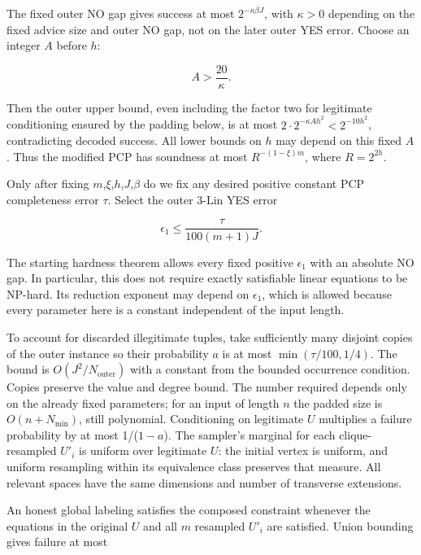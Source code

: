 The fixed outer NO gap gives success at most \(2^{-\kappa \beta J}\), with \(\kappa\)\(>\)0 depending on the fixed advice size and outer NO gap, not on the later outer YES error. Choose an integer \(A\) before \(h\):

\begin{equation}\label{eq:19}
A>\frac{20}{\kappa}.
\end{equation}

Then the outer upper bound, even including the factor two for legitimate
conditioning ensured by the padding below, is at most
$2\cdot2^{-\kappa Ah^2}<2^{-10h^2}$, contradicting decoded success.
All lower bounds on $h$ may depend on this fixed $A$. Thus the modified
PCP has soundness at most $R^{-(1-\xi)m}$, where $R=2^{2h}$.

Only after fixing \(m\),\(\xi\),\(h\),\(J\),\(\beta\) do we fix any desired positive constant PCP completeness error \(\tau\). Select the outer 3-Lin YES error

\begin{equation}\label{eq:20}
\epsilon_1\le\frac{\tau}{100(m+1)J}.
\end{equation}

The starting hardness theorem allows every fixed positive \(\epsilon_1\) with an absolute NO gap. In particular, this does not require exactly satisfiable linear equations to be NP-hard. Its reduction exponent may depend on \(\epsilon_1\), which is allowed because every parameter here is a constant independent of the input length.

To account for discarded illegitimate tuples, take sufficiently many disjoint copies of the outer instance so their probability \(a\) is at most \(\min(\tau/100,1/4)\). The bound is \(O(J^2/N_{\mathrm{outer}})\) with a constant from the bounded occurrence condition. Copies preserve the value and degree bound. The number required depends only on the already fixed parameters; for an input of length \(n\) the padded size is \(O(n+N_{\min})\), still polynomial. Conditioning on legitimate \(U\) multiplies a failure probability by at most 1/(\(1-a\)). The sampler's marginal for each clique-resampled \(U'_i\) is uniform over legitimate \(U\): the initial vertex is uniform, and uniform resampling within its equivalence class preserves that measure. All relevant spaces have the same dimensions and number of transverse extensions.

An honest global labeling satisfies the composed constraint whenever the equations in the original \(U\) and all \(m\) resampled \(U'_i\) are satisfied. Union bounding gives failure at most

